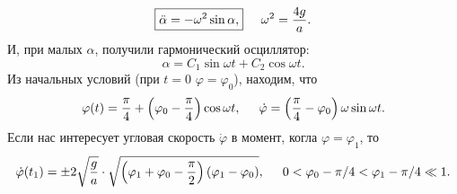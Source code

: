 \begin{equation}
\boxed{
     \ddot{\alpha} = - \omega^2 \sin \alpha,   
}
    \hspace{0.5cm} \omega^2 = \frac{4g}{a}.
\end{equation}
И, при малых $\alpha$, получили гармонический осциллятор:
\begin{equation*}
    \alpha = C_1 \sin \omega t + C_2 \cos \omega t.
\end{equation*}
Из начальных условий (при $t=0$ $\varphi = \varphi_0$), находим, что
\begin{equation*}
    \varphi(t) = \frac{\pi}{4} + \left(\varphi_0 - \frac{\pi}{4} \right) \cos \omega t,
    \hspace{0.5cm} 
    \dot{\varphi} = \left(\frac{\pi}{4} - \varphi_0\right) \omega \sin \omega t.
\end{equation*}
Если нас интересует угловая скорость $\dot{\varphi}$ в момент, когла $\varphi = \varphi_1$, то
\begin{equation}
    \dot{\varphi}(t_1) = \pm 2 \sqrt{\frac{g}{a} } \cdot \sqrt{
        \left(\varphi_1 + \varphi_0 - \frac{\pi}{2}\right) (\varphi_1 - \varphi_0)
    },
    \hspace{0.5cm} 
    0 < \varphi_0 - \pi/4 < \varphi_1 - \pi/4 \ll 1.
\end{equation}